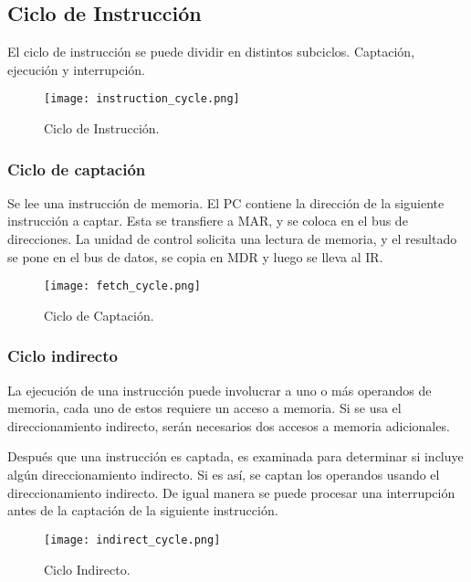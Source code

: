 \documentclass{article}
\begin{document}
\subsection*{Ciclo de Instrucci\'{o}n}
El ciclo de instrucci\'{o}n se puede dividir en distintos subciclos. Captaci\'{o}n,
ejecuci\'{o}n y interrupci\'{o}n.

\begin{figure}[ht]
      \centering
      \texttt{[image: instruction\_cycle.png]}
      \caption{Ciclo de Instrucci\'{o}n.
      \cite{stallings2006organización}}
      \label{fig:structure-and-function-cpu-4}
\end{figure}

\subsubsection*{Ciclo de captaci\'{o}n}
Se lee una instrucci\'{o}n de memoria. El PC contiene la direcci\'{o}n de la
siguiente instrucci\'{o}n a captar. Esta se transfiere a MAR, y se coloca en el
bus de direcciones. La unidad de control solicita una lectura de memoria, y el
resultado se pone en el bus de datos, se copia en MDR y luego se lleva al IR.

\begin{figure}[ht]
      \centering
      \texttt{[image: fetch\_cycle.png]}
      \caption{Ciclo de Captaci\'{o}n.
      \cite{stallings2006organización}}
      \label{fig:structure-and-function-cpu-5}
\end{figure}

\subsubsection*{Ciclo indirecto}
La ejecuci\'{o}n de una instrucci\'{o}n puede involucrar a uno o m\'{a}s operandos
de memoria, cada uno de estos requiere un acceso a memoria. Si se usa el direccionamiento
indirecto, ser\'{a}n necesarios dos accesos a memoria adicionales.

Despu\'{e}s que una instrucci\'{o}n es captada, es examinada para determinar si
incluye alg\'{u}n direccionamiento indirecto. Si es as\'{i}, se captan los operandos
usando el direccionamiento indirecto. De igual manera se puede procesar una
interrupci\'{o}n antes de la captaci\'{o}n de la siguiente instrucci\'{o}n.

\begin{figure}[ht]
      \centering
      \texttt{[image: indirect\_cycle.png]}
      \caption{Ciclo Indirecto.
            \cite{stallings2006organización}}
      \label{fig:structure-and-function-cpu-6}
\end{figure}
\end{document}
